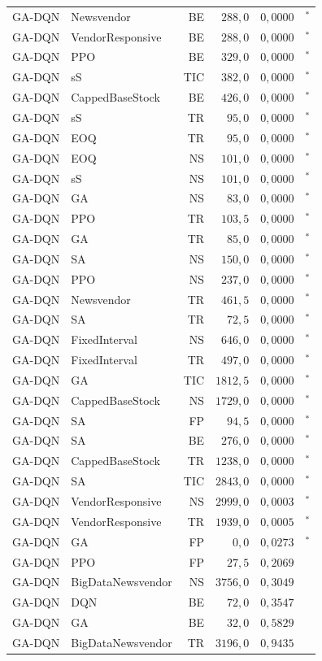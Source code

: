 \begin{table}[htb]
\begin{tabular}{llrrrl}
GA-DQN & Newsvendor & BE & $288{,}0$ & $0{,}0000$ & $^{*}$ \\
GA-DQN & VendorResponsive & BE & $288{,}0$ & $0{,}0000$ & $^{*}$ \\
GA-DQN & PPO & BE & $329{,}0$ & $0{,}0000$ & $^{*}$ \\
GA-DQN & sS & TIC & $382{,}0$ & $0{,}0000$ & $^{*}$ \\
GA-DQN & CappedBaseStock & BE & $426{,}0$ & $0{,}0000$ & $^{*}$ \\
GA-DQN & sS & TR & $95{,}0$ & $0{,}0000$ & $^{*}$ \\
GA-DQN & EOQ & TR & $95{,}0$ & $0{,}0000$ & $^{*}$ \\
GA-DQN & EOQ & NS & $101{,}0$ & $0{,}0000$ & $^{*}$ \\
GA-DQN & sS & NS & $101{,}0$ & $0{,}0000$ & $^{*}$ \\
GA-DQN & GA & NS & $83{,}0$ & $0{,}0000$ & $^{*}$ \\
GA-DQN & PPO & TR & $103{,}5$ & $0{,}0000$ & $^{*}$ \\
GA-DQN & GA & TR & $85{,}0$ & $0{,}0000$ & $^{*}$ \\
GA-DQN & SA & NS & $150{,}0$ & $0{,}0000$ & $^{*}$ \\
GA-DQN & PPO & NS & $237{,}0$ & $0{,}0000$ & $^{*}$ \\
GA-DQN & Newsvendor & TR & $461{,}5$ & $0{,}0000$ & $^{*}$ \\
GA-DQN & SA & TR & $72{,}5$ & $0{,}0000$ & $^{*}$ \\
GA-DQN & FixedInterval & NS & $646{,}0$ & $0{,}0000$ & $^{*}$ \\
GA-DQN & FixedInterval & TR & $497{,}0$ & $0{,}0000$ & $^{*}$ \\
GA-DQN & GA & TIC & $1812{,}5$ & $0{,}0000$ & $^{*}$ \\
GA-DQN & CappedBaseStock & NS & $1729{,}0$ & $0{,}0000$ & $^{*}$ \\
GA-DQN & SA & FP & $94{,}5$ & $0{,}0000$ & $^{*}$ \\
GA-DQN & SA & BE & $276{,}0$ & $0{,}0000$ & $^{*}$ \\
GA-DQN & CappedBaseStock & TR & $1238{,}0$ & $0{,}0000$ & $^{*}$ \\
GA-DQN & SA & TIC & $2843{,}0$ & $0{,}0000$ & $^{*}$ \\
GA-DQN & VendorResponsive & NS & $2999{,}0$ & $0{,}0003$ & $^{*}$ \\
GA-DQN & VendorResponsive & TR & $1939{,}0$ & $0{,}0005$ & $^{*}$ \\
GA-DQN & GA & FP & $0{,}0$ & $0{,}0273$ & $^{*}$ \\
GA-DQN & PPO & FP & $27{,}5$ & $0{,}2069$ &  \\
GA-DQN & BigDataNewsvendor & NS & $3756{,}0$ & $0{,}3049$ &  \\
GA-DQN & DQN & BE & $72{,}0$ & $0{,}3547$ &  \\
GA-DQN & GA & BE & $32{,}0$ & $0{,}5829$ &  \\
GA-DQN & BigDataNewsvendor & TR & $3196{,}0$ & $0{,}9435$ &  \\
\bottomrule
\end{tabular}
\end{table}